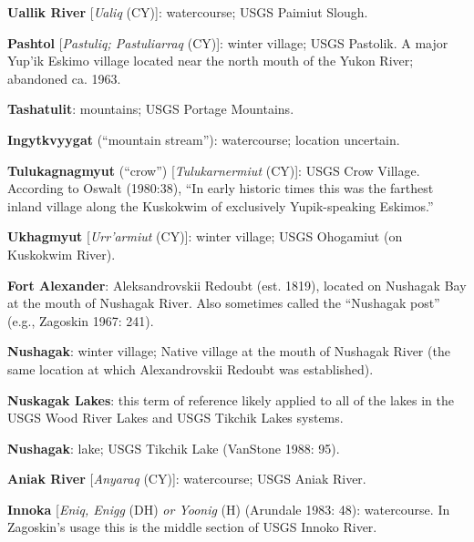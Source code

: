 \begin{hang}

\textbf{Uallik River} [\textit{Ualiq} (CY)]: watercourse; USGS Paimiut Slough.



\textbf{Pashtol} [\textit{Pastuliq; Pastuliarraq} (CY)]: winter village; USGS Pastolik. A major Yup’ik Eskimo village located near the north mouth of the Yukon River; abandoned ca. 1963.



\textbf{Tashatulit}: mountains; USGS Portage Mountains.



\textbf{Ingytkvyygat} (“mountain stream”): watercourse; location uncertain.



\textbf{Tulukagnagmyut} (“crow”) [\textit{Tulukarnermiut} (CY)]: USGS Crow Village. According to Oswalt (1980:38), “In early historic times this was the farthest inland village along the Kuskokwim of exclusively Yupik-speaking Eskimos.”



\textbf{Ukhagmyut} [\textit{Urr’armiut} (CY)]: winter village; USGS Ohogamiut (on Kuskokwim River).



\textbf{Fort Alexander}: Aleksandrovskii Redoubt (est. 1819), located on Nushagak Bay at the mouth of Nushagak River. Also sometimes called the “Nushagak post” (e.g., Zagoskin 1967: 241).\textbf{ }



\textbf{Nushagak}: winter village; Native village at the mouth of Nushagak River (the same location at which Alexandrovskii Redoubt was established).



\textbf{Nuskagak Lakes}: this term of reference likely applied to all of the lakes in the USGS Wood River Lakes and USGS Tikchik Lakes systems.



\textbf{Nushagak}: lake; USGS Tikchik Lake (VanStone 1988: 95).



\textbf{Aniak River} [\textit{Anyaraq} (CY)]: watercourse; USGS Aniak River.



\textbf{Innoka} [\textit{Eniq, Enigg }(DH) \textit{or Yoonig} (H) (Arundale 1983: 48): watercourse. In Zagoskin’s usage this is the middle section of USGS Innoko River.




\end{hang}
